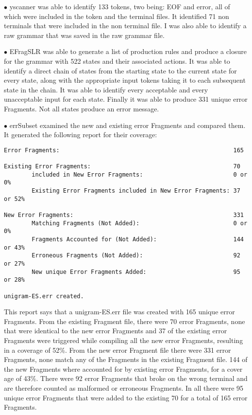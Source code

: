 \documentclass{article}
\begin{document}
$\bullet$ yscanner was able to identify 133 tokens, two being: EOF and error, all of which were included in the token and the terminal files.  It identified 71 non terminals that were included in the non terminal file.  I was also able to identify a raw grammar that was saved in the raw grammar file.

$\bullet$ EFragSLR was able to generate a list of production rules and produce a closure for the grammar with 522 states and their associated actions.  It was able to identify a direct chain of states from the starting state to the current state for every state, along with the appropriate input tokens taking it to each subsequent state in the chain.  It was able to identify every acceptable and every unacceptable input for each state.  Finally it was able to produce 331 unique error Fragments.  Not all states produce an error message. ~\cite{jeffery}

$\bullet$ errSubset examined the new and existing error Fragments and compared them.  It generated the following report for their coverage:
\begin{verbatim}
Error Fragments:                                                  165

Existing Error Fragments:                                         70
        included in New Error Fragments:                          0 or 0%
        Existing Error Fragments included in New Error Fragments: 37 or 52%

New Error Fragments:                                              331
        Matching Fragments (Not Added):                           0 or 0%
        Fragments Accounted for (Not Added):                      144 or 43%
        Erroneous Fragments (Not Added):                          92 or 27%
        New unique Error Fragments Added:                         95 or 28%

unigram-ES.err created.
\end{verbatim}

This report says that a unigram-ES.err file was created with 165 unique error Fragments.  From the existing  Fragment file, there were 70 error Fragments, none that were identical to the new error Fragments and 37 of the existing error Fragments were triggered while compiling all the new error Fragments, resulting in a coverage of 52\%.  From the new error Fragment file there were 331 error Fragments, none match any of the Fragments in the existing Fragment file. 144 of the new Fragments where accounted for by existing error Fragments, for a cover age of 43\%.  There were 92 error Fragments that broke on the wrong terminal and are therefore counted as malformed or erroneous Fragments.  In all there were 95 unique error Fragments that were added to the existing 70 for a total of 165 error Fragments.
\end{document}

